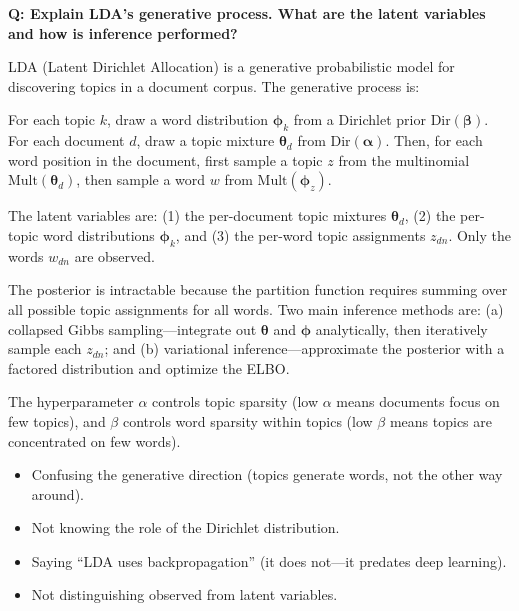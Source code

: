 \begin{interviewq}
\textbf{Q: Explain LDA's generative process.  What are the latent variables
and how is inference performed?}

 \quad {} \quad \badgefreq{\freqlow}

\stronganswer
LDA (Latent Dirichlet Allocation) is a generative probabilistic model for
discovering topics in a document corpus.  The generative process is:

For each topic $k$, draw a word distribution $\bm{\phi}_k$ from a Dirichlet
prior $\text{Dir}(\bm{\beta})$.  For each document $d$, draw a topic mixture
$\bm{\theta}_d$ from $\text{Dir}(\bm{\alpha})$.  Then, for each word position
in the document, first sample a topic $z$ from the multinomial
$\text{Mult}(\bm{\theta}_d)$, then sample a word $w$ from
$\text{Mult}(\bm{\phi}_z)$.

The latent variables are: (1) the per-document topic mixtures $\bm{\theta}_d$,
(2) the per-topic word distributions $\bm{\phi}_k$, and (3) the per-word topic
assignments $z_{dn}$.  Only the words $w_{dn}$ are observed.

The posterior is intractable because the partition function requires summing
over all possible topic assignments for all words.  Two main inference methods
are: (a) collapsed Gibbs sampling---integrate out $\bm{\theta}$ and
$\bm{\phi}$ analytically, then iteratively sample each $z_{dn}$; and
(b) variational inference---approximate the posterior with a factored
distribution and optimize the ELBO.

The hyperparameter $\alpha$ controls topic sparsity (low $\alpha$ means
documents focus on few topics), and $\beta$ controls word sparsity within
topics (low $\beta$ means topics are concentrated on few words).

\redflags
\begin{itemize}
    \item Confusing the generative direction (topics generate words, not the
          other way around).
    \item Not knowing the role of the Dirichlet distribution.
    \item Saying ``LDA uses backpropagation'' (it does not---it predates
          deep learning).
    \item Not distinguishing observed from latent variables.
\end{itemize}



\end{interviewq}
